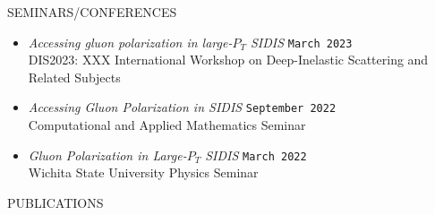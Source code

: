 \documentclass[10pt,a4paper]{article}
\newcommand\datei[1]{\texttt{#1}}
\newenvironment{cvsection}[1]
{
{\LARGE #1} \hrulefill
\vspace*{3ex}
}
{
\vspace*{3ex}
}
\begin{document}
\begin{cvsection}{SEMINARS/CONFERENCES}
\begin{itemize}[leftmargin=*,label=$\circ$]
\item \textit{Accessing gluon polarization in large-$P_T$ SIDIS} \hfill \datei{March 2023} \\
DIS2023: XXX International Workshop on Deep-Inelastic Scattering and Related Subjects

\item \textit{Accessing Gluon Polarization in SIDIS} \hfill \datei{September 2022} \\
Computational and Applied Mathematics Seminar


\item \textit{Gluon Polarization in Large-$P_T$ SIDIS} \hfill \datei{March 2022} \\
Wichita State University Physics Seminar

\end{itemize}



\end{cvsection}





\begin{cvsection}{PUBLICATIONS}



\end{cvsection}
\end{document}
